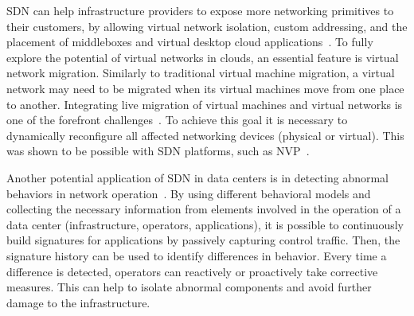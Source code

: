 %

SDN can help infrastructure providers to expose more networking primitives to their customers, by allowing virtual network isolation, custom addressing, and the placement of middleboxes and virtual desktop cloud applications~\cite{benson2011,calyam2013}. 
To fully explore the potential of virtual networks in clouds, an essential feature is virtual network migration. 
Similarly to traditional virtual machine migration, a virtual network may need to be migrated when its virtual machines move from one place to another. Integrating live migration of virtual 
machines and virtual networks is one of the forefront challenges~\cite{keller2012}.
To achieve this goal it is necessary to dynamically reconfigure all affected networking devices (physical or 
virtual).
This was shown to be possible with SDN platforms, such as NVP~\cite{koponen}.

Another potential application of SDN in data centers is in detecting abnormal behaviors in network 
operation~\cite{arefin2013}. By using different behavioral models and collecting the necessary 
information from elements involved in the operation of a data center (infrastructure, operators, applications), 
it is possible to continuously build signatures for applications by passively capturing control traffic.
Then, the signature history can be used to identify differences in behavior.
Every time a difference is detected, operators can reactively or proactively take corrective measures.
This can help to isolate abnormal components and avoid further damage to the
infrastructure.

